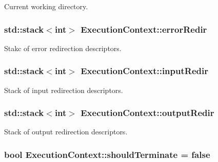Current working directory. 

\subsubsection[{\texorpdfstring{error\+Redir}{errorRedir}}]{\setlength{\rightskip}{0pt plus 5cm}std\+::stack$<$int$>$ Execution\+Context\+::error\+Redir}\hypertarget{structExecutionContext_aa5d29389a31755f8a0c1099f7c7768bf}{}\label{structExecutionContext_aa5d29389a31755f8a0c1099f7c7768bf}


Stakc of error redirection descriptors. 

\subsubsection[{\texorpdfstring{input\+Redir}{inputRedir}}]{\setlength{\rightskip}{0pt plus 5cm}std\+::stack$<$int$>$ Execution\+Context\+::input\+Redir}\hypertarget{structExecutionContext_a33562118feda5571fe0ba87186670679}{}\label{structExecutionContext_a33562118feda5571fe0ba87186670679}


Stack of input redirection descriptors. 

\subsubsection[{\texorpdfstring{output\+Redir}{outputRedir}}]{\setlength{\rightskip}{0pt plus 5cm}std\+::stack$<$int$>$ Execution\+Context\+::output\+Redir}\hypertarget{structExecutionContext_a15af12d7e8146ae1a5f091b7d9919c8c}{}\label{structExecutionContext_a15af12d7e8146ae1a5f091b7d9919c8c}


Stack of output redirection descriptors. 

\subsubsection[{\texorpdfstring{should\+Terminate}{shouldTerminate}}]{\setlength{\rightskip}{0pt plus 5cm}bool Execution\+Context\+::should\+Terminate = false}\hypertarget{structExecutionContext_a3b3a2c509c6c08190a8ee67e39dd80cf}{}\label{structExecutionContext_a3b3a2c509c6c08190a8ee67e39dd80cf}


